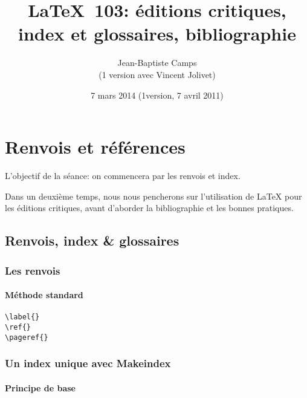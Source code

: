 \documentclass[a4paper,twoside,french,12pt]{book}
\title{\LaTeX\ 103: éditions critiques, index et glossaires, bibliographie}
\date{7 mars 2014 (1\iere{}version, 7 avril 2011)}
\author{Jean-Baptiste Camps\\ (1\iere{} version avec Vincent Jolivet)}
\begin{document}
\maketitle

\chapter{Renvois et références}

L'objectif de la séance: on commencera par les renvois et index. 

Dans un deuxième temps, nous nous pencherons sur l'utilisation de \LaTeX{} pour les éditions critiques, avant d'aborder la bibliographie et les bonnes pratiques.



\section{Renvois, index \& glossaires}

\subsection{Les renvois}

\subsubsection{Méthode standard}
\begin{verbatim}
\label{}
\ref{}
\pageref{}
\end{verbatim}





\subsection{Un index unique avec Makeindex}

\subsubsection{Principe de base}
\end{document}
